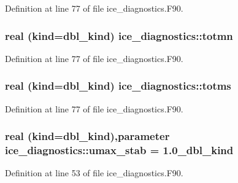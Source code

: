 Definition at line 77 of file ice\_\-diagnostics.F90.\hypertarget{namespaceice__diagnostics_a07a894a84b541e5cdb03c7b30cfa6bdd}{
\subsubsection[{totmn}]{\setlength{\rightskip}{0pt plus 5cm}real (kind=dbl\_\-kind) {\bf ice\_\-diagnostics::totmn}}}
\label{namespaceice__diagnostics_a07a894a84b541e5cdb03c7b30cfa6bdd}


Definition at line 77 of file ice\_\-diagnostics.F90.\hypertarget{namespaceice__diagnostics_abdb06061e5db5f354797848bbd36dbb2}{
\subsubsection[{totms}]{\setlength{\rightskip}{0pt plus 5cm}real (kind=dbl\_\-kind) {\bf ice\_\-diagnostics::totms}}}
\label{namespaceice__diagnostics_abdb06061e5db5f354797848bbd36dbb2}


Definition at line 77 of file ice\_\-diagnostics.F90.\hypertarget{namespaceice__diagnostics_aa1bd3bdd9f09aa609191984ea21310c9}{
\subsubsection[{umax\_\-stab}]{\setlength{\rightskip}{0pt plus 5cm}real (kind=dbl\_\-kind),parameter {\bf ice\_\-diagnostics::umax\_\-stab} = 1.0\_\-dbl\_\-kind}}
\label{namespaceice__diagnostics_aa1bd3bdd9f09aa609191984ea21310c9}


Definition at line 53 of file ice\_\-diagnostics.F90.